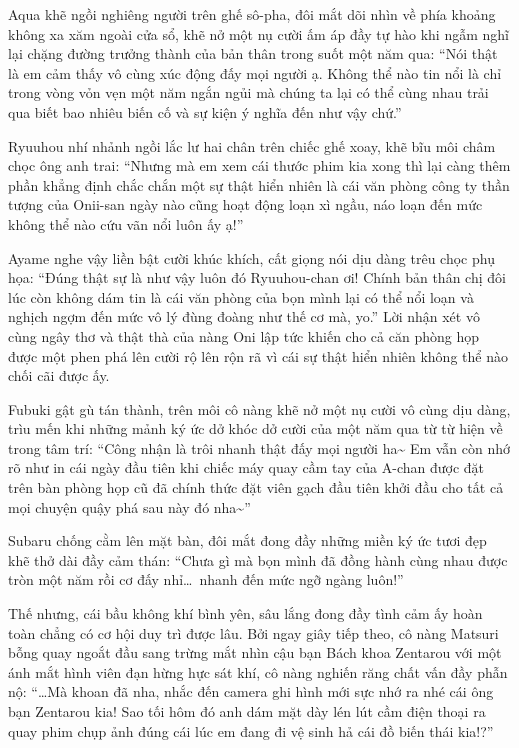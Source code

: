 \documentclass[../main.tex]{subfiles}
\begin{document}
Aqua khẽ ngồi nghiêng người trên ghế sô-pha, đôi mắt dõi nhìn về phía khoảng không xa xăm ngoài cửa sổ, khẽ nở một nụ cười ấm áp đầy tự hào khi ngẫm nghĩ lại chặng đường trưởng thành của bản thân trong suốt một năm qua: ``Nói thật là em cảm thấy vô cùng xúc động đấy mọi người ạ. Không thể nào tin nổi là chỉ trong vòng vỏn vẹn một năm ngắn ngủi mà chúng ta lại có thể cùng nhau trải qua biết bao nhiêu biến cố và sự kiện ý nghĩa đến như vậy chứ.''

Ryuuhou nhí nhảnh ngồi lắc lư hai chân trên chiếc ghế xoay, khẽ bĩu môi châm chọc ông anh trai: ``Nhưng mà em xem cái thước phim kia xong thì lại càng thêm phần khẳng định chắc chắn một sự thật hiển nhiên là cái văn phòng công ty thần tượng của Onii-san ngày nào cũng hoạt động loạn xì ngầu, náo loạn đến mức không thể nào cứu vãn nổi luôn ấy ạ!''

Ayame nghe vậy liền bật cười khúc khích, cất giọng nói dịu dàng trêu chọc phụ họa: ``Đúng thật sự là như vậy luôn đó Ryuuhou-chan ơi! Chính bản thân chị đôi lúc còn không dám tin là cái văn phòng của bọn mình lại có thể nổi loạn và nghịch ngợm đến mức vô lý đùng đoàng như thế cơ mà, yo.'' Lời nhận xét vô cùng ngây thơ và thật thà của nàng Oni lập tức khiến cho cả căn phòng họp được một phen phá lên cười rộ lên rộn rã vì cái sự thật hiển nhiên không thể nào chối cãi được ấy.

Fubuki gật gù tán thành, trên môi cô nàng khẽ nở một nụ cười vô cùng dịu dàng, trìu mến khi những mảnh ký ức dở khóc dở cười của một năm qua từ từ hiện về trong tâm trí: ``Công nhận là trôi nhanh thật đấy mọi người ha\~{} Em vẫn còn nhớ rõ như in cái ngày đầu tiên khi chiếc máy quay cầm tay của A-chan được đặt trên bàn phòng họp cũ đã chính thức đặt viên gạch đầu tiên khởi đầu cho tất cả mọi chuyện quậy phá sau này đó nha\~{}''

Subaru chống cằm lên mặt bàn, đôi mắt đong đầy những miền ký ức tươi đẹp khẽ thở dài đầy cảm thán: ``Chưa gì mà bọn mình đã đồng hành cùng nhau được tròn một năm rồi cơ đấy nhỉ\dots\ nhanh đến mức ngỡ ngàng luôn!''

Thế nhưng, cái bầu không khí bình yên, sâu lắng đong đầy tình cảm ấy hoàn toàn chẳng có cơ hội duy trì được lâu. Bởi ngay giây tiếp theo, cô nàng Matsuri bỗng quay ngoắt đầu sang trừng mắt nhìn cậu bạn Bách khoa Zentarou với một ánh mắt hình viên đạn hừng hực sát khí, cô nàng nghiến răng chất vấn đầy phẫn nộ: ``\dots Mà khoan đã nha, nhắc đến camera ghi hình mới sực nhớ ra nhé cái ông bạn Zentarou kia! Sao tối hôm đó anh dám mặt dày lén lút cầm điện thoại ra quay phim chụp ảnh đúng cái lúc em đang đi vệ sinh hả cái đồ biến thái kia!?''
\end{document}

